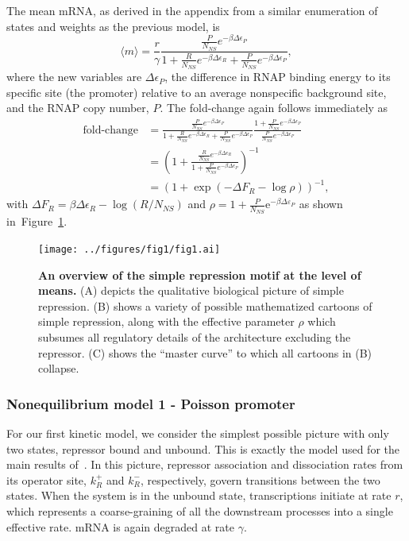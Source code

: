 \documentclass[12pt]{article}%
\newcommand{\fig}[1]{Figure~\ref{#1}}
\begin{document}
The mean mRNA, as derived in the appendix from a similar
enumeration of states and weights as the previous model, is
\begin{equation}
\langle m \rangle = \frac{r}{\gamma}
\frac{\frac{P}{N_{NS}} e^{-\beta\Delta\epsilon_P}}
        {
        1 + \frac{R}{N_{NS}} e^{-\beta\Delta\epsilon_R}
        + \frac{P}{N_{NS}} e^{-\beta\Delta\epsilon_P}
        },
\end{equation}
where the new variables are $\Delta\epsilon_P$, the difference in
RNAP binding energy to its specific site (the promoter) relative
to an average nonspecific background site, and the RNAP copy
number, $P$. The fold-change again follows immediately as
\begin{align}
\text{fold-change}
&= \frac{\frac{P}{N_{NS}} e^{-\beta\Delta\epsilon_P}}
        {
        1 + \frac{R}{N_{NS}} e^{-\beta\Delta\epsilon_R}
        + \frac{P}{N_{NS}} e^{-\beta\Delta\epsilon_P}
        }
\frac{1 + \frac{P}{N_{NS}} e^{-\beta\Delta\epsilon_P}}
        {\frac{P}{N_{NS}} e^{-\beta\Delta\epsilon_P}}
\\
&= \left(
1 + \frac{\frac{R}{N_{NS}} e^{-\beta\Delta\epsilon_R}}
        {1 + \frac{P}{N_{NS}} e^{-\beta\Delta\epsilon_P}}
\right)^{-1}
\\
&= (1 + \exp(-\Delta F_R - \log\rho))^{-1},
\end{align}
with $\Delta F_R = \beta\Delta\epsilon_R - \log(R/N_{NS})$
and $\rho = 1 + \frac{P}{N_{NS}}\mathrm{e}^{-\beta\Delta\varepsilon_P}$
as shown in~\fig{fig1:means_cartoons}.

\begin{figure}%
\centering
\texttt{[image: ../figures/fig1/fig1.ai]}
\caption{
\textbf{
An overview of the simple repression motif at the level of means.}
(A) depicts the qualitative biological picture of simple repression.
(B) shows a variety of possible mathematized cartoons of simple
repression, along with the effective parameter $\rho$
which subsumes all regulatory details
of the architecture excluding the repressor.
(C) shows the ``master curve'' to which all cartoons in (B) collapse.
}
\label{fig1:means_cartoons}
\end{figure}

\subsubsection{Nonequilibrium model 1 - Poisson promoter}
For our first kinetic model, we consider the simplest possible
picture with only two states, repressor bound and unbound.
This is exactly the model used for the main results of~\cite{Jones2014}.
In this picture, repressor association and dissociation rates
from its operator site, $k_R^+$ and $k_R^-$, respectively, govern
transitions between the two states. When the system is in the
unbound state, transcriptions initiate at rate $r$, which
represents a coarse-graining of all the downstream processes into
a single effective rate. mRNA is again degraded at rate $\gamma$.
\end{document}
